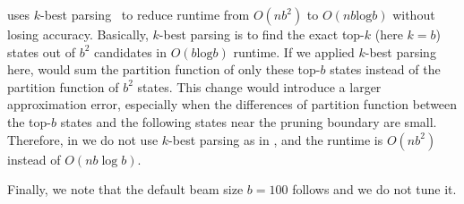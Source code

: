 \smallskip
\linearfold uses $k$-best parsing~\cite{huang+:2005} to reduce runtime from $O(nb^2)$ to $O(nb{\mathrm {log}}b)$ without losing accuracy.
Basically, 
$k$-best parsing is to find the exact top-$k$ (here $k\!=\!b$) states out of $b^2$ candidates
in $O(b{\mathrm {log}}b)$ runtime.
If we applied $k$-best parsing here,
\linearpartition would sum the partition function of only these top-$b$ states
instead of the partition function of $b^2$ states.
This change would introduce a larger approximation error,
especially when the differences of partition function between the top-$b$ states 
and the following states near the pruning boundary are small.
Therefore, in \linearpartition we do not use $k$-best parsing as in \linearfold,
and the runtime is $O(nb^2)$ instead of $O(n b\log b)$.






Finally, we note that the default beam size $b\!=\!100$ follows \linearfold and %
we do not tune it.

